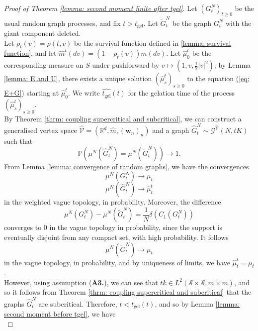 \begin{proof}[Proof of Theorem \ref{lemma: second moment finite after tgel}] Let $(G^N_t)_{t\geq 0}$ be the usual random graph processes, and fix $t>t_\text{gel}$. Let $\widetilde{G}^N_{t}$ be the graph $G^N_{t}$ with the giant component deleted. \medskip \\ Let $\rho_{t}(v)=\rho(t, v)$ be the survival function defined in \ref{lemma: survival function}, and let $\widehat{m}^t(dv)=(1-\rho_{t}(v))m(dv)$. Let $\widehat{\mu}^t_0$ be the corresponding measure on $S$ under pushforward by $v\mapsto (1, v, \frac{1}{2}|v|^2)$; by Lemma \ref{lemma: E and U}, there exists a unique solution $(\widehat{\mu}^t_s)_{s\geq 0}$ to the equation (\ref{eq: E+G}) starting at $\widehat{\mu}^t_0$. We write $\widehat{t_\text{gel}}(t)$ for the gelation time of the process $(\widehat{\mu}^t_s)_{s\geq 0}$. \medskip \\ By Theorem \ref{thrm: coupling supercritical and subcritical}, we can construct a generalised vertex space $\widehat{\mathcal{V}}=(\mathbb{R}^d, \widehat{m}, (\mathbf{w}_n)_n)$ and a graph $\widehat{G}^N_{t}\sim \mathcal{G}^{\widehat{\mathcal{V}}}(N,tK)$ such that 
\begin{equation}
    \mathbb{P}\left(\mu^N(\widehat{G}^N_{t})=\mu^N(\widetilde{G}^N_{t})\right)\rightarrow 1.
\end{equation} From Lemma \ref{lemma: convergence of random graphs}, we have the convergences 
\begin{equation}
    \mu^N(G^N_{t})\rightarrow {\mu}_{t}
\end{equation}
\begin{equation}
    \mu^N(\widehat{G}^N_{t})\rightarrow \widehat{\mu}^t_{t}
\end{equation} in the weighted vague topology, in probability.  Moreover, the difference \begin{equation}
    \mu^N(G^N_{t})-\mu^N(\widetilde{G}^N_{t})=\frac{1}{N}\delta(C_1(G^N_{t}))
\end{equation} converges to $0$ in the vague topology in probability, since the support is eventually disjoint from any compact set, with high probability. It follows \begin{equation}
    \mu^N(\widetilde{G}^N_{t})\rightarrow \mu_{t}
\end{equation} in the vague topology, in probability, and by uniqueness of limits, we have $\widehat{\mu}^t_{t}=\mu_{t}$.\medskip \\ However, using assumption (\textbf{A3.}), we can see that $t k\in L^2(\mathcal{S}\times\mathcal{S}, m\times m)$, and so it follows from Theorem \ref{thrm: coupling supercritical and subcritical} that the graphs $\widehat{G}^N_{t}$ are subcritical. Therefore, $t<\widehat{t_\text{gel}}(t)$, and so by Lemma \ref{lemma: second moment before tgel}, we have \begin{equation}

\end{equation}
\end{proof}
